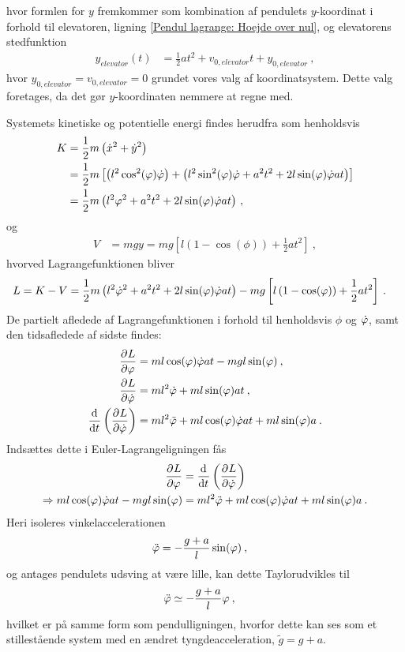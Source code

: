 hvor formlen for $y$ fremkommer som kombination af pendulets $y$-koordinat i forhold til elevatoren, ligning \eqref{Pendul lagrange: Hoejde over nul}, og elevatorens stedfunktion
\begin{align}
	y_{elevator}(t) &= \frac{1}{2}at^2 + v_{0,elevator} t + y_{0,elevator} \: ,
\end{align}
hvor $y_{0,elevator} = v_{0,elevator} = 0$ grundet vores valg af koordinatsystem. Dette valg foretages, da det gør $y$-koordinaten nemmere at regne med.

\noindent
Systemets kinetiske og potentielle energi findes herudfra som henholdsvis
%
\begin{align}
	K &= \frac{1}{2} m \left( \dot{x}^2 + \dot{y}^2 \right) \nonumber \\
	&= \frac{1}{2} m \left[ \left( l^2 \cos^2(\varphi) \dot{\varphi} \right) + \left( l^2 \sin^2(\varphi) \dot{\varphi} + a^2t^2 + 2 l \sin(\varphi) \dot{\varphi} a t \right) \right] \nonumber \\
	&= \frac{1}{2} m \left( l^2\varphi^2 + a^2t^2 + 2l\sin(\varphi)\dot{\varphi}at \right) \, ,
\end{align}
%
og
%
\begin{align}
	V &= mgy = mg \left[ l \left( 1 - \cos(\phi) \right) + \frac{1}{2}at^2 \right] \: ,
\end{align}
%
hvorved Lagrangefunktionen bliver
%
\begin{align}
	L &= K-V = \frac{1}{2} m \left( l^2\dot{\varphi}^2 + a^2t^2 + 2l\sin(\varphi)\dot{\varphi}at \right) - mg \left[ l \left( 1 - \cos(\varphi) \right) + \frac{1}{2}at^2 \right] \: .
\end{align}
%
De partielt afledede af Lagrangefunktionen i forhold til henholdsvis $\phi$ og $\dot{\varphi}$, samt den tidsafledede af sidste findes:
%
\begin{align}
	\frac{\partial^{}{L}}{\partial {\varphi}^{}} &= ml\cos(\varphi)\dot{\varphi}at - mgl\sin(\varphi) \: , \\
	\frac{\partial^{}{L}}{\partial {\dot{\varphi}}^{}} &= ml^2\dot{\varphi} + ml\sin(\varphi)at \: , \\
	\frac{\mathrm{d}^{}{}}{{\mathrm{d} {t}}^{}} \left(\frac{\partial^{}{L}}{\partial {\dot{\varphi}}^{}}\right) &= ml^2\ddot{\varphi} + ml\cos(\varphi)\dot{\varphi}at + ml\sin(\varphi)a \: .
\end{align}
%
Indsættes dette i Euler-Lagrangeligningen fås
%
\begin{align}
	\frac{\partial^{}{L}}{\partial {\varphi}^{}} &= \frac{\mathrm{d}^{}{}}{{\mathrm{d} {t}}^{}}\left( \frac{\partial^{}{L}}{\partial {\dot{\varphi}}^{}} \right) \nonumber \\
	 \Rightarrow ml\cos(\varphi)\dot{\varphi}at - mgl\sin(\varphi) &= ml^2\ddot{\varphi} + ml\cos(\varphi)\dot{\varphi}at + ml\sin(\varphi)a \: .
\end{align}
%
Heri isoleres vinkelaccelerationen
%
\begin{align}
	\ddot{\varphi} &= - \frac{g+a}{l}\sin(\varphi) \: ,
\end{align}
%
og antages pendulets udsving at være lille, kan dette Taylorudvikles til
\begin{align}
	\ddot{\varphi} &\simeq - \frac{g+a}{l}\varphi \: ,
\end{align}
hvilket er på samme form som pendulligningen, hvorfor dette kan ses som et stillestående system med en ændret tyngdeacceleration, $\tilde{g} = g + a$.

